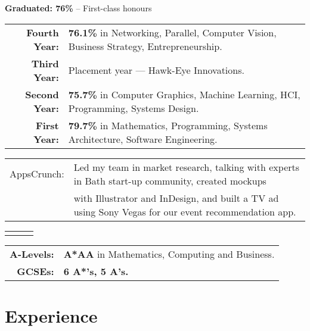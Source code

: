 \documentclass[a4paper]{deedy-resume}
\begin{document}
\vspace{3mm}
{\normalsize \textbf{Graduated: 76\%} -- First-class honours}
\vspace{3mm}

\begin{addmargin}[2em]{0em}
\indent\begin{tabular}{r l}
\textbf{Fourth Year:} & \textbf{76.1\%} in Networking, Parallel, Computer Vision, Business Strategy, Entrepreneurship.\\
\textbf{Third Year:} & Placement year --- Hawk-Eye Innovations.\\
\textbf{Second Year:} & \textbf{75.7\%} in Computer Graphics, Machine Learning, HCI, Programming, Systems Design.\\
\textbf{First Year:} & \textbf{79.7\%} in Mathematics, Programming, Systems Architecture, Software Engineering.\\
\end{tabular}
\end{addmargin}

\vspace{4mm}
\raggedright\begin{tabular}{ll}
AppsCrunch: & Led my team in market research, talking with experts in Bath start-up community, created mockups\\
& with Illustrator and InDesign, and built a TV ad using Sony Vegas for our event recommendation app.\\
\end{tabular}
\sectionspace

\noindent\begin{tabularx}{\textwidth}{@{}YQZ@{}}
 &  & 
\end{tabularx}
\vspace{0.5mm}
\begin{addmargin}[2em]{0em}
\indent\begin{tabular}{r l}
\textbf{A-Levels:} & \textbf{A*AA} in Mathematics, Computing and Business.\\
\textbf{GCSEs:} & \textbf{6 A*'s, 5 A's.}\\
\end{tabular}
\end{addmargin}
\sectionspace %

\section{Experience}
\normalfont
{}
\vspace{2 mm}
\end{document}
